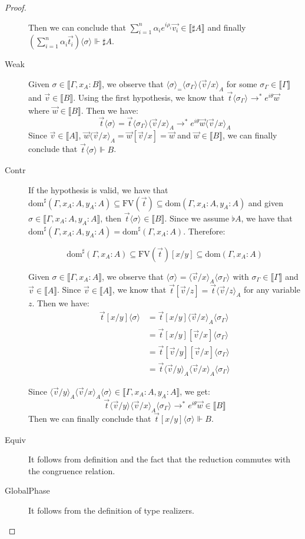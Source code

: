 \documentclass[runningheads,orivec,envcountsame,envcountsect]{llncs}
\newcommand\lra{\longrightarrow}
\newcommand\ansubst[2]{\ensuremath{\langle #1 \rangle_{#2}}}
\newcommand\dom[1]{\mathrm{dom}(#1)}
\newcommand\sdom[1]{\mathrm{dom}^{\sharp}(#1)}
\newcommand\FV[1]{\mathrm{FV}(#1)}
\def\eval{\lra^*}
\def\sem#1{\llbracket#1\rrbracket}
\def\real{\Vdash}
\begin{document}
\begin{proof}
\begin{description}
    Then we can conclude that $\sum_{i=1}^{n}\alpha_i e^{i\rho_i}\vec{v_i}\in\sem{\sharp A}$ and finally $(\sum_{i=1}^{n}\alpha_i\vec{t_i})\ansubst{\sigma}{}\real\sharp A$.

    \item[Weak] Given $\sigma\in\sem{\Gamma,x_A:B}$, we observe that $\ansubst{\sigma}=\ansubst{\sigma_\Gamma}{}\ansubst{\vec{v}/x}{A}$ for some $\sigma_\Gamma\in\sem{\Gamma}$ and $\vec{v}\in\sem{B}$. Using the first hypothesis, we know that $\vec{t}\ansubst{\sigma_\Gamma}{}\eval e^{i\theta}\vec{w}$ where $\vec{w}\in\sem{B}$. Then we have:
    \[
    \vec{t}\ansubst{\sigma}{}=\vec{t}\ansubst{\sigma_\Gamma}{}\ansubst{\vec{v}/x}{A}\eval e^{i\theta}\vec{w}\ansubst{\vec{v}/x}{A}
    \]
    Since $\vec{v}\in\sem{A}$, $\vec{w}\ansubst{\vec{v}/x}{A}=\vec{w}[\vec{v}/x]=\vec{w}$ and $\vec{w}\in\sem{B}$, we can finally conclude that $\vec{t}\ansubst{\sigma}{}\real B$.

    \item[Contr] If the hypothesis is valid, we have that $\sdom{\Gamma, x_A:A, y_A:A}\subseteq\FV{\vec{t}}\subseteq\dom{\Gamma,x_A:A, y_A:A}$ and given $\sigma\in\sem{\Gamma,x_A:A, y_A:A}$, then $\vec{t}\ansubst{\sigma}{}\in\sem{B}$. Since we assume $\flat A$, we have that $\sdom{\Gamma,x_A:A, y_A:A}=\sdom{\Gamma,x_A:A}$. Therefore:
    
    \[
    \sdom{\Gamma,x_A:A}\subseteq\FV{\vec{t}}[x/y]\subseteq\dom{\Gamma,x_A:A}
    \]

    Given $\sigma\in\sem{\Gamma,x_A:A}$, we observe that $\ansubst{\sigma}{}=\ansubst{\vec{v}/x}{A}\ansubst{\sigma_\Gamma}{}$ with $\sigma_\Gamma\in\sem{\Gamma}$ and $\vec{v}\in\sem{A}$. Since $\vec{v}\in\sem{A}$, we know that $\vec{t}[\vec v/z] =\vec{t}\ansubst{\vec{v}/z}{A}$ for any variable $z$. Then we have:
    \begin{align*}
        \vec{t}[x/y]\ansubst{\sigma}{} &= \vec{t}[x/y]\ansubst{\vec{v}/x}{A}\ansubst{\sigma_\Gamma}{}\\
        &=\vec{t}[x/y][\vec{v}/x]\ansubst{\sigma_\Gamma}{}\\
        &=\vec{t}[\vec{v}/y][\vec{v}/x]\ansubst{\sigma_\Gamma}{}\\
        &=\vec{t}\ansubst{\vec{v}/y}{A}\ansubst{\vec{v}/x}{A}\ansubst{\sigma_\Gamma}{}    
    \end{align*}
    
    Since $\ansubst{\vec{v}/y}{A}\ansubst{\vec{v}/x}{A}\ansubst{\sigma}{}\in\sem{\Gamma,x_A:A,y_A:A}$, we get:
    \[\vec{t}\ansubst{\vec{v}/y}{}\ansubst{\vec{v}/x}{A}\ansubst{\sigma_\Gamma}{}\eval e^{i\theta}\vec{w}\in\sem{B}\]
    Then we can finally conclude that $\vec{t}[x/y]\ansubst{\sigma}{}\real B$.

    \item[Equiv] It follows from definition and the fact that the reduction commutes with the congruence relation.
    
    \item[GlobalPhase] It follows from the definition of type realizers.
    \end{description}
\end{proof}
\end{document}
